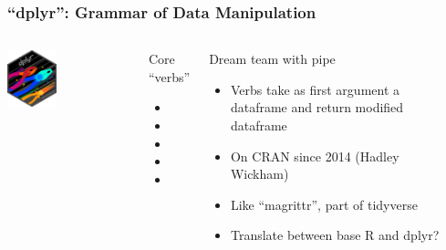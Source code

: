 \begin{frame}
	\frametitle{``dplyr'': Grammar of Data Manipulation}
	\begin{columns}[onlytextwidth]
		\hspace*{0.5cm}\includegraphics[width=0.4\textwidth]{../figs/dplyr.png}
		\begin{block}{Core ``verbs''}
			\begin{itemize}
				\item {}
				\item {}
				\item {}
				\item {}
				\item {}
			\end{itemize}
		\end{block}
		
		\begin{block}{Dream team with pipe}
			\begin{itemize}
				\item Verbs take as first argument a dataframe and return modified dataframe
				\item On CRAN since 2014 (Hadley Wickham)
				\item Like ``magrittr'', part of tidyverse
				\item Translate between base R and dplyr?
			\end{itemize}
		\end{block}

		\begin{example}
		\end{example}
	\end{columns}
\end{frame}

